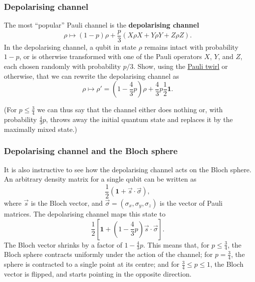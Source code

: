 \documentclass[fleqn]{article}
\begin{document}
\hypertarget{depolarising-channel}{%
\subsubsection{Depolarising channel}\label{depolarising-channel}}

The most ``popular'' Pauli channel is the \textbf{depolarising channel}
\[
  \rho\longmapsto (1-p)\rho + \frac{p}{3}\left(X\rho X+Y\rho Y+Z\rho Z\right).
\]
In the depolarising channel, a qubit in state \(\rho\) remains intact with probability \(1-p\), or is otherwise transformed with one of the Pauli operators \(X\), \(Y\), and \(Z\), each chosen randomly with probability \(p/3\).
Show, using the \protect\hyperlink{puali-twirl}{Pauli twirl} or otherwise, that we can rewrite the depolarising channel as
\[
  \rho \longmapsto \rho'
  = \left(1-\frac{4}{3} p\right) \rho + \frac{4}{3}p\frac{1}{2}\mathbf{1}.
\]

(For \(p\leqslant\frac{3}{4}\) we can thus say that the channel either does nothing or, with probability \(\frac{4}{3}p\), throws away the initial quantum state and replaces it by the maximally mixed state.)

\hypertarget{depolarising-channel-and-the-bloch-sphere}{%
\subsubsection{Depolarising channel and the Bloch sphere}\label{depolarising-channel-and-the-bloch-sphere}}

It is also instructive to see how the depolarising channel acts on the Bloch sphere.
An arbitrary density matrix for a single qubit can be written as
\[
  \frac{1}{2}(\mathbf{1}+\vec{s}\cdot\vec{\sigma}),
\]
where \(\vec{s}\) is the Bloch vector, and \(\vec{\sigma}=(\sigma_x,\sigma_y,\sigma_z)\) is the vector of Pauli matrices.
The depolarising channel maps this state to
\[
  \frac{1}{2}\left[
    \mathbf{1}+ \left(1-\frac{4}{3}p\right)\vec{s}\cdot\vec{\sigma}
  \right].
\]
The Bloch vector shrinks by a factor of \(1-\frac{4}{3}p\).
This means that, for \(p\leqslant\frac{3}{4}\), the Bloch sphere contracts uniformly under the action of the channel;
for \(p=\frac{3}{4}\), the sphere is contracted to a single point at its centre;
and for \(\frac{3}{4}\leqslant p\leqslant 1\), the Bloch vector is flipped, and starts pointing in the opposite direction.

\hypertarget{section-38}{%
\subsubsection{}\label{section-38}}
\end{document}
